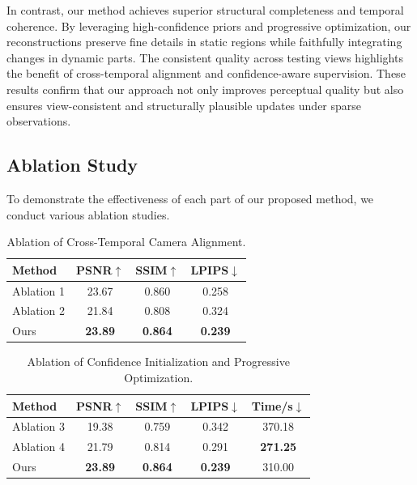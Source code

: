\documentclass[letterpaper]{article} %
\begin{document}
In contrast, our method achieves superior structural completeness and temporal coherence. By leveraging high-confidence priors and progressive optimization, our reconstructions preserve fine details in static regions while faithfully integrating changes in dynamic parts. The consistent quality across testing views highlights the benefit of cross-temporal alignment and confidence-aware supervision.
These results confirm that our approach not only improves perceptual quality but also ensures view-consistent and structurally plausible updates under sparse observations.


\subsection{Ablation Study}

To demonstrate the effectiveness of each part of our proposed method, we conduct various ablation studies.

\begin{table}[t]
\centering
\label{tab:alignment_ablation}
\begin{tabular}{lccc}
\toprule
\textbf{Method} & \textbf{PSNR}$\uparrow$ & \textbf{SSIM}$\uparrow$ & \textbf{LPIPS}$\downarrow$ \\
\midrule
Ablation 1  & 23.67 & 0.860 & 0.258 \\
Ablation 2  & 21.84 & 0.808 & 0.324 \\
Ours        & \textbf{23.89} & \textbf{0.864} & \textbf{0.239} \\
\bottomrule
\end{tabular}
\caption{Ablation of Cross-Temporal Camera Alignment.}
\label{tab:alignment_ablation}
\end{table}

\begin{table}[h]
\centering

\label{tab:confidence_ablation}
\begin{tabular}{lcccc}
\toprule
\textbf{Method} & \textbf{PSNR}$\uparrow$ & \textbf{SSIM}$\uparrow$ & \textbf{LPIPS}$\downarrow$ & \textbf{Time/s}$\downarrow$ \\
\midrule
Ablation 3              & 19.38 & 0.759 & 0.342 & 370.18 \\
Ablation 4              & 21.79 & 0.814 & 0.291 & \textbf{271.25} \\
Ours        & \textbf{23.89} & \textbf{0.864} & \textbf{0.239} & 310.00 \\
\bottomrule
\end{tabular}
\caption{Ablation of Confidence Initialization and Progressive Optimization.}
\label{tab:confidence_ablation}
\end{table}
\end{document}
